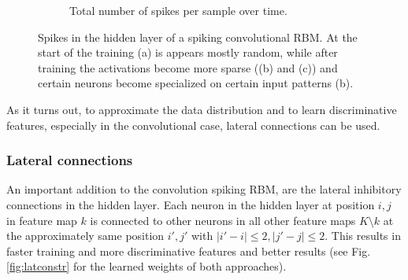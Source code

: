 \begin{figure}[h!]
\begin{subfigure}[t]{.32\textwidth}
  		\caption{Total number of spikes per sample over time.}
  		\label{fig:sub2}
	\end{subfigure}
	\caption[Spikes in the hidden layer of a spiking convolutional RBM.]{Spikes in the hidden layer of a spiking convolutional RBM. At the start of the training (a) is appears mostly random, while after training the activations become more sparse ((b) and (c))  and certain neurons become specialized on certain input patterns (b).}
	\label{fig:actdevstr}
\end{figure}

As it turns out, to approximate the data distribution and to learn discriminative features, especially in the convolutional case, lateral connections can be used.

\subsubsection{Lateral connections} \label{c:latinhibexp}

An important addition to the convolution spiking RBM, are the lateral inhibitory connections in the hidden layer. 
Each neuron in the hidden layer at position $i,j$ in feature map $k$ is connected to other neurons in all other feature maps $K \setminus k$ at the approximately same position $i', j'$ with $ |i'-i| \le 2 , |j' - j| \le 2 $.   
This results in faster training and more discriminative features and better results (see Fig. \ref{fig:latconstr} for the learned weights of both approaches).

